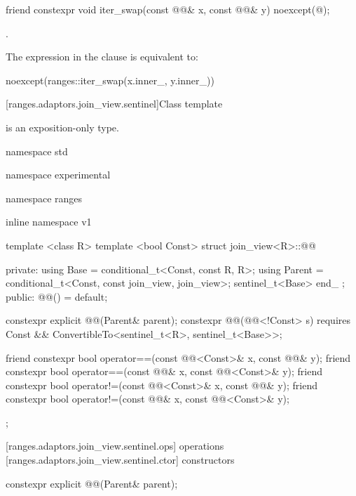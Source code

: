 \begin{itemdecl}
friend constexpr void iter_swap(const @@& x, const @@& y)
  noexcept(@\seebelow@);
\end{itemdecl}

\begin{itemdescr}
\pnum
\returns {}.

\pnum
\remarks The expression in the  clause is equivalent to:
\begin{codeblock}
noexcept(ranges::iter_swap(x.inner_, y.inner_))
\end{codeblock}
\end{itemdescr}

[ranges.adaptors.join_view.sentinel]{Class template }

\pnum
{} is an exposition-only type.

\begin{codeblock}
namespace std { namespace experimental { namespace ranges { inline namespace v1 {
  template <class R>
  template <bool Const>
  struct join_view<R>::@@ {
  private:
    using Base = conditional_t<Const, const R, R>;
    using Parent = conditional_t<Const, const join_view, join_view>;
    sentinel_t<Base> end_ {};
  public:
    @@() = default;

    constexpr explicit @@(Parent& parent);
    constexpr @@(@@<!Const> s) requires Const &&
        ConvertibleTo<sentinel_t<R>, sentinel_t<Base>>;

    friend constexpr bool operator==(const @@<Const>& x, const @@& y);
    friend constexpr bool operator==(const @@& x, const @@<Const>& y);
    friend constexpr bool operator!=(const @@<Const>& x, const @@& y);
    friend constexpr bool operator!=(const @@& x, const @@<Const>& y);
  };
}}}}
\end{codeblock}

[ranges.adaptors.join_view.sentinel.ops]{ operations}
[ranges.adaptors.join_view.sentinel.ctor]{ constructors}

\begin{itemdecl}
constexpr explicit @@(Parent& parent);
\end{itemdecl}

